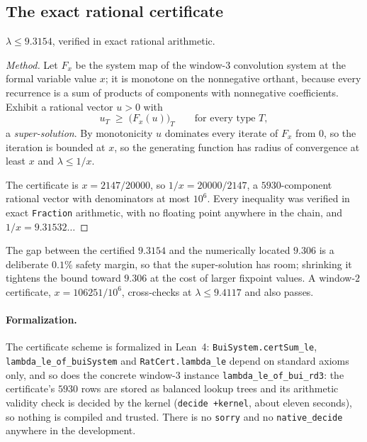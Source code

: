 \documentclass[11pt]{article}
\begin{document}
\subsection{The exact rational certificate}

\begin{theorem}
\label{thm:upper}
$\lambda \le 9.3154$, verified in exact rational arithmetic.
\end{theorem}

\begin{proof}[Method]
Let $F_x$ be the system map of the window-$3$ convolution system at the formal
variable value $x$; it is monotone on the nonnegative orthant, because every
recurrence is a sum of products of components with nonnegative coefficients.
Exhibit a rational vector $u > 0$ with
\[
  u_T \;\ge\; \bigl(F_x(u)\bigr)_T \qquad\text{for every type } T ,
\]
a \emph{super-solution}. By monotonicity $u$ dominates every iterate of $F_x$
from $0$, so the iteration is bounded at $x$, so the generating function has
radius of convergence at least $x$ and $\lambda \le 1/x$.

The certificate is $x = 2147/20000$, so $1/x = 20000/2147$, a $5930$-component rational vector with
denominators at most $10^6$. Every inequality was verified in exact
\texttt{Fraction} arithmetic, with no floating point anywhere in the chain, and
$1/x = 9.31532\dots$
\end{proof}

The gap between the certified $9.3154$ and the numerically located $9.306$ is a
deliberate $0.1\%$ safety margin, so that the super-solution has room; shrinking
it tightens the bound toward $9.306$ at the cost of larger fixpoint values. A
window-$2$ certificate, $x = 106251/10^6$, cross-checks at $\lambda \le 9.4117$
and also passes.

\paragraph{Formalization.} The certificate scheme is formalized in Lean~4:
\texttt{BuiSystem.certSum\_le}, \texttt{lambda\_le\_of\_buiSystem} and
\texttt{RatCert.lambda\_le} depend on standard axioms only, and so does the
concrete window-$3$ instance \texttt{lambda\_le\_of\_bui\_rd3}: the
certificate's $5930$ rows are stored as balanced lookup trees and its
arithmetic validity check is decided by the kernel (\texttt{decide +kernel},
about eleven seconds), so nothing is compiled and trusted. There is no
\texttt{sorry} and no \texttt{native\_decide} anywhere in the development.
\end{document}
